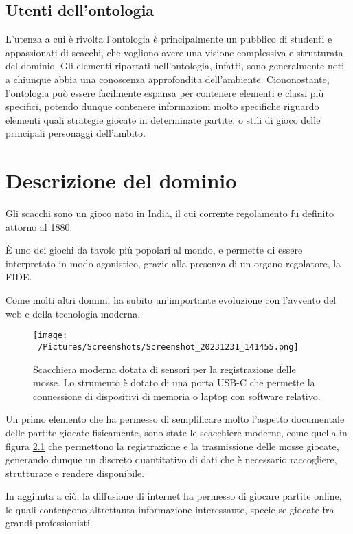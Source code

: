 \documentclass[12pt]{book}
\begin{document}
\section{Utenti dell'ontologia}

L'utenza a cui è rivolta l'ontologia è principalmente un pubblico di
studenti e appassionati di scacchi, che vogliono avere una visione
complessiva e strutturata del dominio. Gli elementi riportati nell'ontologia,
infatti, sono generalmente noti a chiunque abbia una conoscenza
approfondita dell'ambiente. Ciononostante, l'ontologia può essere
facilmente espansa per contenere elementi e classi più specifici,
potendo dunque contenere informazioni molto specifiche riguardo
elementi quali strategie giocate in determinate partite, o stili di
gioco delle principali personaggi dell'ambito.

\chapter{Descrizione del dominio}

Gli scacchi sono un gioco nato in India, il cui corrente regolamento 
fu definito attorno al 1880. 

È uno dei giochi da tavolo più popolari al mondo,
e permette di essere interpretato in modo agonistico,
grazie alla presenza di un organo regolatore, la FIDE.

Come molti altri domini, ha subito un'importante evoluzione con l'avvento del web e
della tecnologia moderna.

\begin{figure}[h]
  \caption{Scacchiera moderna dotata di sensori per la registrazione
  delle mosse. Lo strumento è dotato di una porta USB-C che permette
  la connessione di dispositivi di memoria o laptop con software
  relativo.}
  \centering
  \label{fig:scacchiera}
  \texttt{[image: ~/Pictures/Screenshots/Screenshot\_20231231\_141455.png]}
\end{figure} 

Un primo elemento che ha permesso di
semplificare molto l'aspetto documentale
delle partite giocate fisicamente, sono state le scacchiere moderne,
come quella in figura \ref{fig:scacchiera} che
permettono la registrazione e la trasmissione delle mosse giocate,
generando dunque un discreto quantitativo di dati che è necessario
raccogliere, strutturare e rendere disponibile.

In aggiunta a ciò, la diffusione di internet ha permesso di giocare
partite
online, le quali contengono altrettanta informazione interessante,
specie se giocate fra grandi professionisti. 
\end{document}
